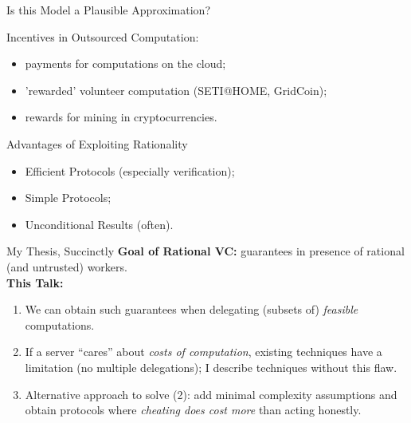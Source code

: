 \begin{frame}{Is this Model a Plausible Approximation?}
\begin{block}{Incentives in Outsourced Computation:}
	\begin{itemize}[<+- | alert@+>]
		\item  payments for computations on the cloud; %
		\item 'rewarded' volunteer computation (SETI@HOME, GridCoin);
		\item  rewards for mining in cryptocurrencies.
	\end{itemize}
\end{block}
\end{frame}

\begin{frame}{Advantages of Exploiting Rationality}

	\begin{itemize}[<+- | alert@+>]
		\item Efficient Protocols (especially verification);
		\item Simple Protocols;
		\item  Unconditional Results (often).
	\end{itemize}

\end{frame}


\begin{frame}[t]{My Thesis, Succinctly}
	\textbf{Goal of Rational VC:} guarantees in presence of rational (and untrusted) workers.\\\vspace{0.9cm} \pause
	\textbf{This Talk:}\\
	\begin{enumerate}
		\item We can obtain such guarantees when delegating (subsets of) \textit{feasible} computations.\pause %
		\item If a server ``cares'' about \textit{costs of computation}, existing techniques have a limitation (no multiple delegations); \pause I describe techniques without this flaw.\pause
		\item Alternative approach to solve (2): add minimal complexity assumptions and obtain protocols where \textit{cheating does cost more} than acting honestly.
	\end{enumerate}
\end{frame}

